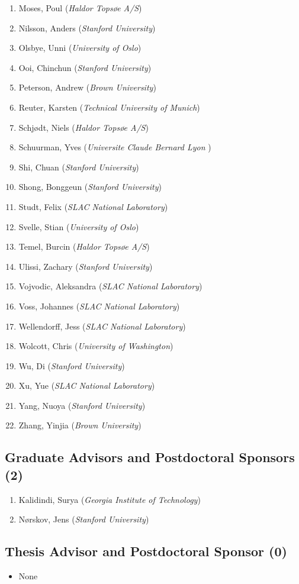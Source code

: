 \begin{enumerate}
\item
  Moses, Poul (\emph{Haldor Topsøe A/S})
\item
  Nilsson, Anders (\emph{Stanford University})
\item
  Olsbye, Unni (\emph{University of Oslo})
\item
  Ooi, Chinchun (\emph{Stanford University})
\item
  Peterson, Andrew (\emph{Brown University})
\item
  Reuter, Karsten (\emph{Technical University of Munich})
\item
  Schjødt, Niels (\emph{Haldor Topsøe A/S})
\item
  Schuurman, Yves (\emph{Universite Claude Bernard Lyon })
\item
  Shi, Chuan (\emph{Stanford University})
\item
  Shong, Bonggeun (\emph{Stanford University})
\item
  Studt, Felix (\emph{SLAC National Laboratory})
\item
  Svelle, Stian (\emph{University of Oslo})
\item
  Temel, Burcin (\emph{Haldor Topsøe A/S})
\item
  Ulissi, Zachary (\emph{Stanford University})
\item
  Vojvodic, Aleksandra (\emph{SLAC National Laboratory})
\item
  Voss, Johannes (\emph{SLAC National Laboratory})
\item
  Wellendorff, Jess (\emph{SLAC National Laboratory})
\item
  Wolcott, Chris (\emph{University of Washington})
\item
  Wu, Di (\emph{Stanford University})
\item
  Xu, Yue (\emph{SLAC National Laboratory})
\item
  Yang, Nuoya (\emph{Stanford University})
\item
  Zhang, Yinjia (\emph{Brown University})
\end{enumerate}

\subsection*{Graduate Advisors and Postdoctoral Sponsors
(2)}\label{graduate-advisors-and-postdoctoral-sponsors-2}

\begin{enumerate}
\def\labelenumi{\arabic{enumi}.}
\itemsep1pt\parskip0pt
\item
  Kalidindi, Surya (\emph{Georgia Institute of Technology})
\item
  N\o{}rskov, Jens (\emph{Stanford University})
\end{enumerate}

\subsection*{Thesis Advisor and Postdoctoral Sponsor
(0)}\label{thesis-advisor-and-postdoctoral-sponsor-0}

\begin{itemize}
\itemsep1pt\parskip0pt
\item
  None
\end{itemize}